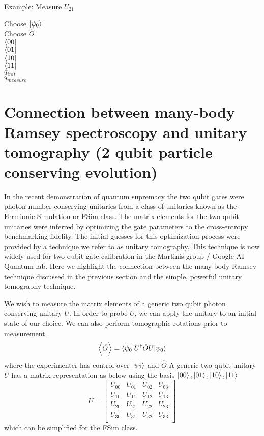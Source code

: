 \documentclass{article}
\begin{document}
    Example: Measure $U_{21}$

    Choose $\ket{\psi_0}$\\
    Choose $\hat{O}$\\

    $\bra{00}$\\
    $\bra{01}$\\
    $\bra{10}$\\
    $\bra{11}$\\
    $q_{init}$\\
    $q_{measure}$\\

    \section{ Connection between many-body Ramsey spectroscopy and unitary tomography (2 qubit particle conserving evolution)}
    In the recent demonstration of quantum supremacy \cite{Arute2019} the two qubit gates were photon number conserving unitaries from a class of unitaries
    known as the Fermionic Simulation or FSim class\cite{Kivlichan2018}.
    The matrix elements for the two qubit unitaries were inferred by optimizing the gate parameters to the cross-entropy benchmarking fidelity.
    The initial guesses for this optimization process were provided by a technique we refer to as unitary tomography.
    This technique is now widely used for two qubit gate calibration in the Martinis group / Google AI Quantum lab.
    Here we highlight the connection between the many-body Ramsey technique discussed in the previous section and the simple, powerful unitary tomography technique.

    We wish to measure the matrix elements of a generic two qubit photon conserving unitary $U$.
    In order to probe $U$, we can apply the unitary to an initial state of our choice.  We can also perform tomographic rotations prior to measurement.
    \begin{equation}
        \left< \hat{O} \right> = \braket{\psi_0 | U^{\dagger} \hat{O} U | \psi_0 }
    \end{equation}
    where the experimenter has control over $\ket{\psi_0}$ and $\hat{O}$
    A generic two qubit unitary $U$ has a matrix representation as below using the basis $\ket{00}, \ket{01}, \ket{10}, \ket{11}$
    \begin{equation}
        U =
        \begin{bmatrix}
            U_{00} & U_{01} & U_{02} & U_{03} \\
            U_{10} & U_{11} & U_{12} & U_{13} \\
            U_{20} & U_{21} & U_{22} & U_{23} \\
            U_{30} & U_{31} & U_{32} & U_{33} \\
        \end{bmatrix}
    \end{equation}
    which can be simplified for the FSim class.
\end{document}
